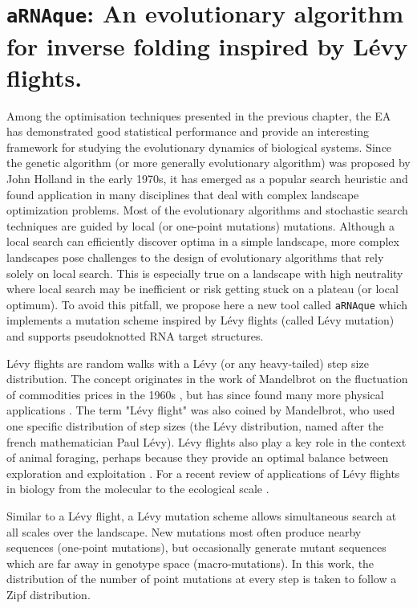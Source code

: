 \chapter{\texttt{aRNAque}: An evolutionary algorithm for inverse folding inspired by Lévy flights.}\label{ch:arnaque}

Among the optimisation techniques presented in the previous chapter, the EA has demonstrated good statistical performance and provide an interesting framework for studying the evolutionary dynamics of biological systems. Since the genetic algorithm (or more generally evolutionary algorithm) was proposed by John Holland \cite{holland1992adaptation} in the early 1970s, it has emerged as a popular search heuristic and found application in many disciplines that deal with complex landscape optimization problems. Most of the evolutionary algorithms and stochastic search techniques are  guided by local (or one-point mutations) mutations. Although a local search can efficiently discover optima in a simple landscape, more complex landscapes pose challenges to the design of evolutionary algorithms that rely solely on local search. This is especially true on a landscape with high neutrality  where local search may be inefficient or risk getting stuck on a plateau (or local optimum). To avoid this pitfall, we propose here a new tool called \texttt{aRNAque} which implements a mutation scheme inspired by Lévy flights (called Lévy mutation) and supports pseudoknotted RNA target structures.

Lévy flights are random walks with a Lévy (or any heavy-tailed) step size distribution. The concept originates in the work of Mandelbrot on the fluctuation of commodities prices in the 1960s \cite{mandelbrot1972certain}, but has since found many more physical applications \cite{shlesinger1995levy}. The term "Lévy flight" was also coined by Mandelbrot, who used one specific distribution of step sizes (the Lévy distribution, named after the french mathematician Paul Lévy). Lévy flights also play a key role in the context of animal foraging, perhaps because they provide an optimal balance between exploration and exploitation \cite{viswanathan2008levy,kamaruzaman2013levy}. For a recent review of applications of Lévy flights in biology from the molecular to the ecological scale \cite{reynolds2018current}.

Similar to a Lévy flight, a Lévy mutation scheme allows simultaneous search at all scales over the landscape. New mutations most often produce nearby sequences (one-point mutations), but occasionally generate mutant sequences which are far away in genotype space (macro-mutations). In this work, the distribution of the number of point mutations at every step is taken to follow a Zipf distribution. 

